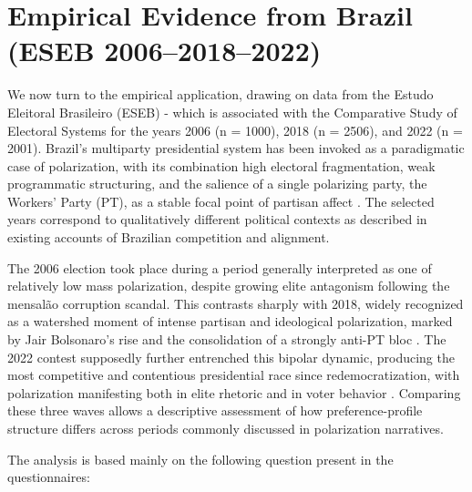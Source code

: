 \documentclass[12pt]{article}
\begin{document}
\section{Empirical Evidence from Brazil (ESEB 2006–2018–2022)}



We now turn to the empirical application, drawing on data from the Estudo Eleitoral Brasileiro (ESEB) - which is associated with the Comparative Study of Electoral Systems for the years 2006 (n = 1000), 2018 (n = 2506), and 2022 (n = 2001). Brazil’s multiparty presidential system has been invoked as a paradigmatic case of  polarization, with its combination high electoral fragmentation, weak programmatic structuring, and the salience of a single polarizing party, the Workers’ Party (PT), as a stable focal point of partisan affect \parencite{samuels2018partisans, nunes2023biografia, elsner2025global}. The selected years correspond to qualitatively different political contexts as described in existing accounts of Brazilian competition and alignment.

The 2006 election took place during a period generally interpreted as one of relatively low mass polarization, despite growing elite antagonism following the mensalão corruption scandal. This contrasts sharply with 2018, widely recognized as a watershed moment of intense partisan and ideological polarization, marked by Jair Bolsonaro’s rise and the consolidation of a strongly anti-PT bloc \parencite{samuels23_partis_stereot_polar_brazil}. The 2022 contest supposedly further entrenched this bipolar dynamic, producing the most competitive and contentious presidential race since redemocratization, with polarization manifesting both in elite rhetoric and in voter behavior \parencite{nunes2023biografia}. Comparing these three waves allows a descriptive assessment of how preference-profile structure differs across periods commonly discussed in polarization narratives.

The analysis is based mainly on the following question present in the questionnaires:
\end{document}
